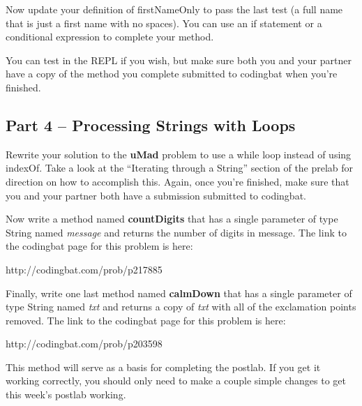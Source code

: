 \begin{exer}
	Now update your definition of firstNameOnly to pass the last test (a full name that is just a first name with no spaces). You can use an if statement or a conditional expression to complete your method.

You can test in the REPL if you wish, but make sure both you and your partner have a copy of the method you complete submitted to codingbat when you're finished.
\end{exer}
\initialbox


\subsection{Part 4 -- Processing Strings with Loops}
\begin{exer}
Rewrite your solution to the \textbf{uMad} problem to use a while loop instead of using indexOf. Take a look at the ``Iterating through a String'' section of the prelab for direction on how to accomplish this. Again, once you're finished, make sure that you and your partner both have a submission submitted to codingbat. 
\end{exer}


\begin{exer}
Now write a method named \textbf{countDigits} that has a single parameter of type String named \textit{message} and returns the number of digits in message.  The link to the codingbat page for this problem is here:

http://codingbat.com/prob/p217885

\end{exer}

\begin{exer}
	Finally, write one last method named \textbf{calmDown} that has a single parameter of type String named \textit{txt} and returns a copy of \textit{txt} with all of the exclamation points removed. The link to the codingbat page for this problem is here:

http://codingbat.com/prob/p203598

This method will serve as a basis for completing the postlab. If you get it working correctly, you should only need to make a couple simple changes to get this week's postlab working. 
\end{exer}

\initialbox

